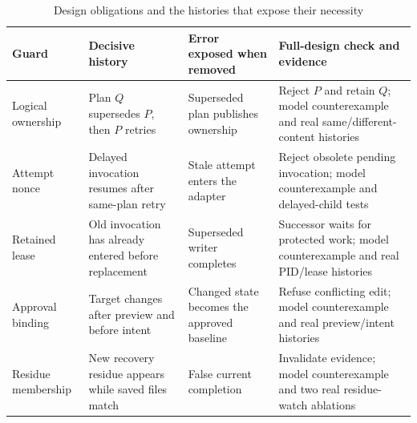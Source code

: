 \begin{table}[!t]\centering\small
\caption{Design obligations and the histories that expose their necessity}\label{tab:eval-guards}
\begin{tabular}{@{}>{\raggedright\arraybackslash}p{2.5cm}>{\raggedright\arraybackslash}p{4.3cm}>{\raggedright\arraybackslash}p{4.4cm}>{\raggedright\arraybackslash}p{4.7cm}@{}}\toprule
Guard & Decisive history & Error exposed when removed & Full-design check and evidence \\\midrule
Logical ownership & Plan $Q$ supersedes $P$, then $P$ retries & Superseded plan publishes ownership & Reject $P$ and retain $Q$; model counterexample and real same/different-content histories \\
Attempt nonce & Delayed invocation resumes after same-plan retry & Stale attempt enters the adapter & Reject obsolete pending invocation; model counterexample and delayed-child tests \\
Retained lease & Old invocation has already entered before replacement & Superseded writer completes & Successor waits for protected work; model counterexample and real PID/lease histories \\
Approval binding & Target changes after preview and before intent & Changed state becomes the approved baseline & Refuse conflicting edit; model counterexample and real preview/intent histories \\
Residue membership & New recovery residue appears while saved files match & False current completion & Invalidate evidence; model counterexample and two real residue-watch ablations \\\bottomrule
\end{tabular}
\end{table}
